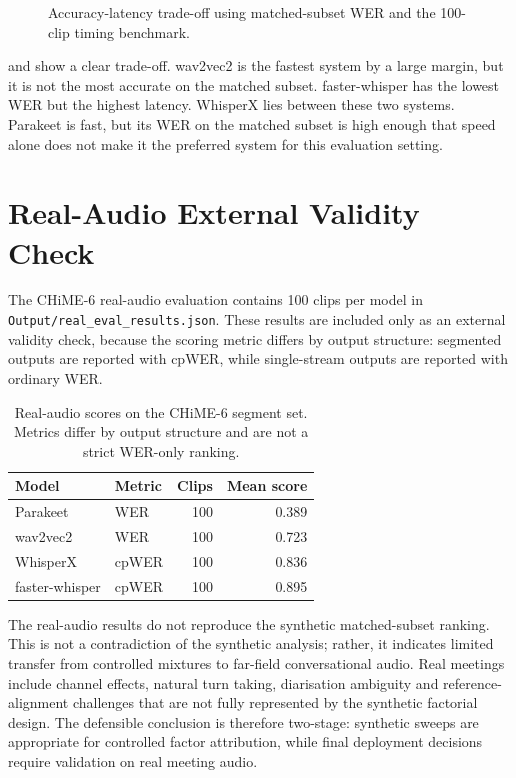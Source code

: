 \begin{figure}[htbp]
    \centering
    \caption{Accuracy-latency trade-off using matched-subset WER and the 100-clip timing benchmark.}
    \label{fig:stat_accuracy_latency}
\end{figure}

 and  show a clear trade-off.
wav2vec2 is the fastest system by a large margin, but it is not the most accurate on the matched
subset. faster-whisper has the lowest WER but the highest latency. WhisperX lies between these
two systems. Parakeet is fast, but its WER on the matched subset is high enough that speed alone
does not make it the preferred system for this evaluation setting.

\section{Real-Audio External Validity Check}
The CHiME-6 real-audio evaluation contains 100 clips per model in
\texttt{Output/real\_eval\_results.json}. These results are included only as an external
validity check, because the scoring metric differs by output structure: segmented outputs are
reported with cpWER, while single-stream outputs are reported with ordinary WER.

\begin{table}[htbp]
\centering
\caption{Real-audio scores on the CHiME-6 segment set. Metrics differ by output structure and are not a strict WER-only ranking.}
\label{tab:real_audio_summary}
\begin{tabular}{llrr}
\toprule
\textbf{Model} & \textbf{Metric} & \textbf{Clips} & \textbf{Mean score} \\
\midrule
Parakeet & WER & 100 & 0.389 \\
wav2vec2 & WER & 100 & 0.723 \\
WhisperX & cpWER & 100 & 0.836 \\
faster-whisper & cpWER & 100 & 0.895 \\
\bottomrule
\end{tabular}
\end{table}

The real-audio results do not reproduce the synthetic matched-subset ranking. This is not a
contradiction of the synthetic analysis; rather, it indicates limited transfer from controlled
mixtures to far-field conversational audio. Real meetings include channel effects, natural turn
taking, diarisation ambiguity and reference-alignment challenges that are not fully represented
by the synthetic factorial design. The defensible conclusion is therefore two-stage: synthetic
sweeps are appropriate for controlled factor attribution, while final deployment decisions
require validation on real meeting audio.

